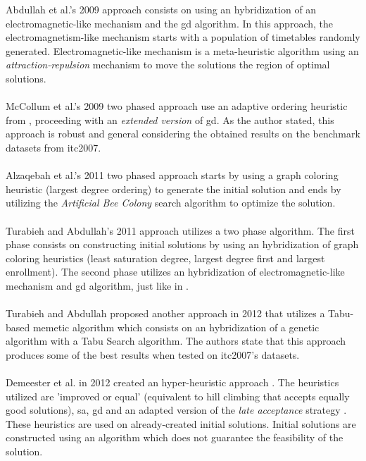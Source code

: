 Abdullah et al.'s 2009 approach \cite{Abdullah2009} consists on using an hybridization of an electromagnetic-like mechanism and the \gls{gd} algorithm. In this approach, the electromagnetism-like mechanism starts with a population of timetables randomly generated. Electromagnetic-like mechanism is a meta-heuristic algorithm using an \textit{attraction-repulsion} mechanism \cite{Javadian2008} to move the solutions the region of optimal solutions.\\
\\
McCollum et al.'s 2009 two phased approach \cite{McCollum2009} use an adaptive ordering heuristic from \cite{Burke2004}, proceeding with an \textit{extended version} of \gls{gd}. As the author stated, this approach is robust and general considering the obtained results on the benchmark datasets from \gls{itc2007}.\\
\\
Alzaqebah et al.'s 2011 two phased approach \cite{Alzaqebah2011} starts by using a graph coloring heuristic (largest degree ordering) to generate the initial solution and ends by utilizing the \textit{Artificial Bee Colony} search algorithm to optimize the solution.\\
\\
Turabieh and Abdullah's 2011 approach \cite{Turabieh2011} utilizes a two phase algorithm. The first phase consists on constructing initial solutions by using an hybridization of graph coloring heuristics (least saturation degree, largest degree first and largest enrollment). The second phase utilizes an hybridization of electromagnetic-like mechanism and \gls{gd} algorithm, just like in \cite{Abdullah2009}.\\
\\
Turabieh and Abdullah proposed another approach in 2012 \cite{Abdullah2012} that utilizes a Tabu-based memetic algorithm which consists on an hybridization of a genetic algorithm with a Tabu Search algorithm. The authors state that this approach produces some of the best results when tested on \gls{itc2007}'s datasets.\\
\\
Demeester et al. in 2012 created an hyper-heuristic approach \cite{Demeester2012}. The heuristics utilized are 'improved or equal' (equivalent to hill climbing that accepts equally good solutions), \gls{sa}, \gls{gd} and an adapted version of the \textit{late acceptance} strategy \cite{Burke2008}. These heuristics are used on already-created initial solutions. Initial solutions are constructed using an algorithm which does not guarantee the feasibility of the solution.\\
